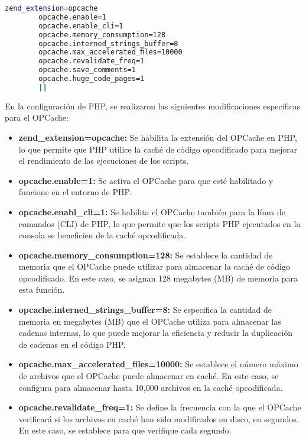 \begin{enumerate}
			\begin{lstlisting}[language=Bash,caption=Valores]
		zend_extension=opcache
		opcache.enable=1
		opcache.enable_cli=1
		opcache.memory_consumption=128
		opcache.interned_strings_buffer=8
		opcache.max_accelerated_ﬁles=10000
		opcache.revalidate_freq=1
		opcache.save_comments=1
		opcache.huge_code_pages=1
		||\end{lstlisting}
		
		En la configuración de PHP, se realizaron las siguientes modificaciones específicas para el OPCache:
		
		\begin{itemize}
			

			
			\item \textbf{zend\_extension=opcache:} Se habilita la extensión del OPCache en PHP, lo que permite que PHP utilice la caché de código opcodificado para mejorar el rendimiento de las ejecuciones de los scripts.
			
			\item \textbf{opcache.enable=1:} Se activa el OPCache para que esté habilitado y funcione en el entorno de PHP.
			
			\item \textbf{opcache.enabl\_cli=1:} Se habilita el OPCache también para la línea de comandos (CLI) de PHP, lo que permite que los scripts PHP ejecutados en la consola se beneficien de la caché opcodificada.
			
			\item\textbf{opcache.memory\_consumption=128:} Se establece la cantidad de memoria que el OPCache puede utilizar para almacenar la caché de código opcodificado. En este caso, se asignan 128 megabytes (MB) de memoria para esta función.
			
			\item\textbf{opcache.interned\_strings\_buffer=8:} Se especifica la cantidad de memoria en megabytes (MB) que el OPCache utiliza para almacenar las cadenas internas, lo que puede mejorar la eficiencia y reducir la duplicación de cadenas en el código PHP.
			
			\item\textbf{opcache.max\_accelerated\_files=10000:} Se establece el número máximo de archivos que el OPCache puede almacenar en caché. En este caso, se configura para almacenar hasta 10,000 archivos en la caché opcodificada.
			
			\item\textbf{opcache.revalidate\_freq=1:} Se define la frecuencia con la que el OPCache verificará si los archivos en caché han sido modificados en disco, en segundos. En este caso, se establece para que verifique cada segundo.
			

\end{itemize}
\end{enumerate}
